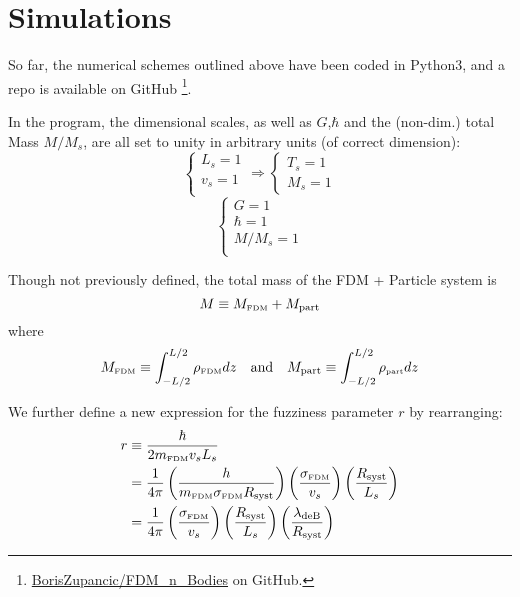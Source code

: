 \documentclass[oneside]{book}
\begin{document}
\chapter{Simulations}
So far, the numerical schemes outlined above have been coded in Python3, and a repo is available on GitHub \footnote{\hyperlink{https://github.com/BorisZupancic/FDM_n_Bodies}{BorisZupancic/FDM\_n\_Bodies} on GitHub.}.

In the program, the dimensional scales, as well as $G$,$\hbar$ and the (non-dim.) total Mass $M/M_s$, are all set to unity in arbitrary units (of correct dimension):
\begin{equation*}
    \begin{cases} L_s = 1\\ v_s = 1\\ \end{cases}\Rightarrow \begin{cases}T_s = 1\\ M_s = 1\end{cases} 
\end{equation*}
\begin{equation*}
    \begin{cases}
        G = 1\\
        \hbar = 1\\
        M / M_s = 1\\
    \end{cases}
\end{equation*}
    
Though not previously defined, the total mass of the FDM + Particle system is 
\begin{equation}
    M \equiv M_\text{\tiny{FDM}} + M_\text{part} \\
\end{equation}
where
\begin{align}
    M_\text{\tiny{FDM}} \equiv \int_{-L/2}^{L/2} \rho_\text{\tiny{FDM}} dz & &\text{and}& &
    M_\text{part} \equiv \int_{-L/2}^{L/2} \rho_\text{\tiny{part}} dz
\end{align}

We further define a new expression for the fuzziness parameter $r$ by rearranging:
\begin{align}
    r & \equiv \frac{\hbar}{2m_\text{\tiny{FDM}} v_s L_s}  \\
    & = \frac{1}{4\pi} \left(\frac{h}{m_\text{\tiny{FDM}} \sigma_\text{\tiny{FDM}} R_\text{syst}}\right) \left(\frac{\sigma_\text{\tiny{FDM}}}{v_s}\right) \left(\frac{R_\text{syst}}{L_s}\right) \\
    & = \frac{1}{4\pi} \left(\frac{\sigma_\text{\tiny{FDM}}}{v_s}\right) \left(\frac{R_\text{syst}}{L_s}\right)
    \left(\frac{\lambda_\text{deB}}{R_\text{syst}}\right)
\end{align}
\end{document}
